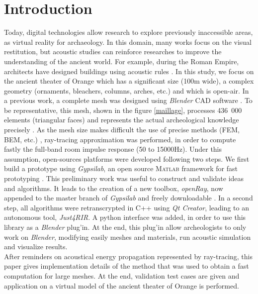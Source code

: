 \documentclass{aes2e}
\begin{document}
\section{Introduction}
\label{sec1}
Today, digital technologies allow research to explore previously inaccessible areas, as virtual reality for archaeology. In this domain, many works focus on the visual restitution, but acoustic studies can reinforce researches to improve the understanding of the ancient world. For example, during the Roman Empire, architects have designed buildings using acoustic rules  \cite{vitruve}. In this study, we focus on the ancient theater of Orange which has a significant size (100m wide), a complex geometry (ornaments, bleachers, columns, arches, etc.) and which is open-air. In a previous work, a complete mesh was designed using \textit{Blender} CAD software \cite{doc_blender}. To be representative, this mesh, shown in the figure \ref{maillage}, processes 436~000 elements (triangular faces) and represents the actual archeological knowledge precisely \cite{theseRobin}. As the mesh size makes difficult the use of precise methods (FEM, BEM, etc.) \cite{gypsilab}, ray-tracing approximation was performed, in order to compute fastly the full-band room impulse response (50 to 15000Hz). Under this assumption, open-sources platforms were developed following two steps. We first build a prototype using \textit{Gypsilab}, an open source \textsc{Matlab} framework for fast prototyping \cite{gypsilab}. This preliminary work was useful to construct and validate ideas and algorithms. It leads to the creation of a new toolbox, \textit{openRay}, now appended to the master branch of \textit{Gypsilab} and freely downloadable \cite{githubGypsi}. In a second step, all algorithms were retranscrypted in C++ using \textit{Qt Creator}, leading to an autonomous tool, \textit{Just4RIR}. A python interface was added, in order to use this library as a \textit{Blender} plug'in. At the end, this plug'in allow archeologists to only work on \textit{Blender}, modifying easily meshes and materials, run acoustic simulation and visualize results. \\
After reminders on acoustical energy propagation represented by ray-tracing, this paper gives implementation details of the method that was used to obtain a fast computation for large meshes. At the end, validation test cases are given and application on a virtual model of the ancient theater of Orange is performed. 
\end{document}
